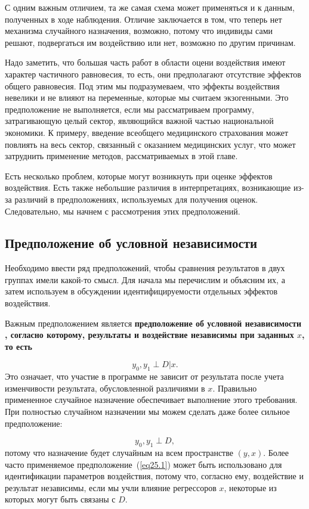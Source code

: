 С одним важным отличием, та же самая схема может применяться и к данным, полученных в ходе наблюдения. Отличие заключается в том, что теперь нет механизма случайного назначения, возможно, потому что индивиды сами решают, подвергаться им воздействию или нет, возможно по другим причинам. 

Надо заметить, что большая часть работ в области оцени воздействия имеют характер частичного равновесия, то есть, они предполагают отсутствие эффектов общего равновесия. Под этим мы подразумеваем, что эффекты воздействия невелики и не влияют на переменные, которые мы считаем экзогенными. Это предположение не выполняется, если мы рассматриваем программу, затрагивающую целый сектор, являющийся важной частью национальной экономики. К примеру, введение всеобщего медицинского страхования может повлиять на весь сектор, связанный с оказанием медицинских услуг, что может затруднить применение методов, рассматриваемых в этой главе. 

Есть несколько проблем, которые могут возникнуть при оценке эффектов воздействия. Есть также небольшие различия в интерпретациях, возникающие из-за различий в предположениях, используемых для получения оценок. Следовательно, мы начнем с рассмотрения этих предположений. 

\subsection{Предположение об условной независимости}

Необходимо ввести ряд предположений, чтобы сравнения результатов в двух группах имели какой-то смысл. Для начала мы перечислим и объясним их, а затем используем в обсуждении идентифицируемости отдельных эффектов воздействия. 

Важным предположением является \bfseries предположение об условной независимости \mdseries, согласно которому, результаты и воздействие независимы при заданных $x$, то есть

\begin{equation}
\label{eq25.1}
y_0, y_1 \perp D | x. 
\end{equation}
Это означает, что участие в программе не зависит от результата после учета изменчивости результата, обусловленной различиями в $x$. Правильно примененное случайное назначение обеспечивает выполнение этого требования. При полностью случайном назначении мы можем сделать даже более сильное предположение:

\begin{equation}
\label{eq25.2}
y_0, y_1 \perp D, 
\end{equation}
потому что назначение будет случайным на всем пространстве $(y, x)$. Более часто применяемое предположение~(\ref{eq25.1}) может быть использовано для идентификации параметров воздействия, потому что, согласно ему, воздействие и результат независимы, если мы учли влияние регрессоров $x$, некоторые из которых могут быть связаны с $D$. 

